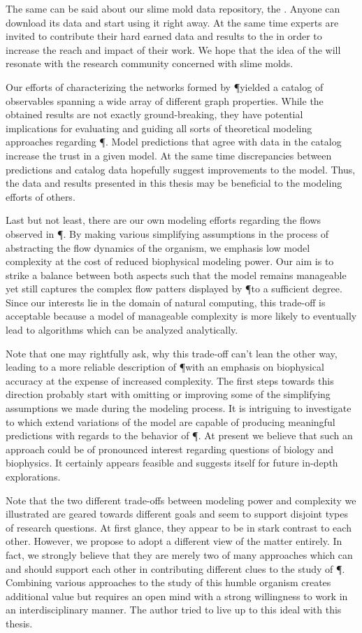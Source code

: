	The same can be said about our slime mold data repository, the \SMGR. Anyone can download its data and start using it right away. At the same time experts are invited to contribute their hard earned data and results to the \SMGR in order to increase the reach and impact of their work. We hope that the idea of the \SMGR will resonate with the research community concerned with slime molds.

	Our efforts of characterizing the networks formed by \P yielded a catalog of observables spanning a wide array of different graph properties. While the obtained results are not exactly ground-breaking, they have potential implications for evaluating and guiding all sorts of theoretical modeling approaches regarding \P. Model predictions that agree with data in the catalog increase the trust in a given model. At the same time discrepancies between predictions and catalog data hopefully suggest improvements to the model. Thus, the data and results presented in this thesis may be beneficial to the modeling efforts of others.

	Last but not least, there are our own modeling efforts regarding the flows observed in \P. By making various simplifying assumptions in the process of abstracting the flow dynamics of the organism, we emphasis low model complexity at the cost of reduced biophysical modeling power. Our aim is to strike a balance between both aspects such that the model remains manageable yet still captures the complex flow patters displayed by \P to a sufficient degree. Since our interests lie in the domain of natural computing, this trade-off is acceptable because a model of manageable complexity is more likely to eventually lead to algorithms which can be analyzed analytically. 

	Note that one may rightfully ask, why this trade-off can't lean the other way, leading to a more reliable description of \P with an emphasis on biophysical accuracy at the expense of increased complexity. The first steps towards this direction probably start with omitting or improving some of the simplifying assumptions we made during the modeling process. It is intriguing to investigate to which extend variations of the model are capable of producing meaningful predictions with regards to the behavior of \P. At present we believe that such an approach could be of pronounced interest regarding questions of biology and biophysics. It certainly appears feasible and suggests itself for future in-depth explorations.

	Note that the two different trade-offs between modeling power and complexity we illustrated are geared towards different goals and seem to support disjoint types of research questions. At first glance, they appear to be in stark contrast to each other. However, we propose to adopt a different view of the matter entirely. In fact, we strongly believe that they are merely two of many approaches which can and should support each other in contributing different clues to the study of \P. Combining various approaches to the study of this humble organism creates additional value but requires an open mind with a strong willingness to work in an interdisciplinary manner. The author tried to live up to this ideal with this thesis.


